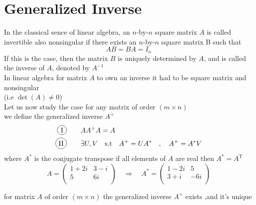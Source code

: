 \documentclass[]{article}
\begin{document}

\section{Generalized Inverse}

In the classical sence of linear algebra, an $n$-by-$n$ square matrix $A$ is 
called invertible also nonsingular 
if there exists an $n$-by-$n$ square matrix B such that
\[
AB = BA = I_n        
\]
If this is the case, then the matrix $B$ is 
uniquely determined by $A$, and is called the 
inverse of $A$, denoted by $A^{-1}$
\\
In linear algebra for matrix $A$ to own an inverse 
it had to be square matrix and nonsingular \\ (i.e $\det(A)\neq0$)
\\
Let us now study the case for any matrix of order $(m\times n)$ \\
we define the generalized inverse $A^{+}$
\begin{align*}
        \circled{I}& \dquad AA^{+}A = A
        \\
        \circled{II}& \dquad \exists  U,V \quad \text{s.t} \quad A^{+} = UA^{*} \quad,\quad A^{+} = A^{*}V
\end{align*}
where $A^{*}$ is the conjugate transpose if all elements of $A$ are real then $A^{*} = A^{\operatorname{T}}$
\[
A = \begin{pmatrix}
        1+2i & 3-i\\
        5 & 6i \\
    \end{pmatrix}
\quad\Longrightarrow \quad
A^{*} = \begin{pmatrix}
        1-2i & 5\\
        3+i & -6i \\
    \end{pmatrix}
\]
\begin{theorem}
        for matrix $A$ of order $(m\times n)$ the generalized inverse $A^{+}$ exists ,and it's unique
\end{theorem}
\end{document}

